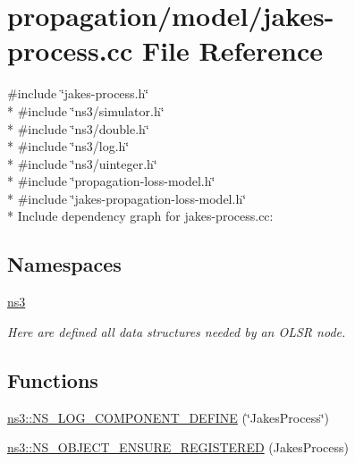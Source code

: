 \hypertarget{jakes-process_8cc}{}\section{propagation/model/jakes-\/process.cc File Reference}
\label{jakes-process_8cc}
{\ttfamily \#include \char`\"{}jakes-\/process.\+h\char`\"{}}\\*
{\ttfamily \#include \char`\"{}ns3/simulator.\+h\char`\"{}}\\*
{\ttfamily \#include \char`\"{}ns3/double.\+h\char`\"{}}\\*
{\ttfamily \#include \char`\"{}ns3/log.\+h\char`\"{}}\\*
{\ttfamily \#include \char`\"{}ns3/uinteger.\+h\char`\"{}}\\*
{\ttfamily \#include \char`\"{}propagation-\/loss-\/model.\+h\char`\"{}}\\*
{\ttfamily \#include \char`\"{}jakes-\/propagation-\/loss-\/model.\+h\char`\"{}}\\*
Include dependency graph for jakes-\/process.cc\+:
\subsection*{Namespaces}
\begin{DoxyCompactItemize}
\item 
 \hyperlink{namespacens3}{ns3}
\begin{DoxyCompactList}\small\item\em Here are defined all data structures needed by an O\+L\+SR node. \end{DoxyCompactList}\end{DoxyCompactItemize}
\subsection*{Functions}
\begin{DoxyCompactItemize}
\item 
\hyperlink{namespacens3_a90eb803120a2e9736536228b3a8eb325}{ns3\+::\+N\+S\+\_\+\+L\+O\+G\+\_\+\+C\+O\+M\+P\+O\+N\+E\+N\+T\+\_\+\+D\+E\+F\+I\+NE} (\char`\"{}Jakes\+Process\char`\"{})
\item 
\hyperlink{namespacens3_a7463a6b0ba208b1790bc2ac1d448f6cf}{ns3\+::\+N\+S\+\_\+\+O\+B\+J\+E\+C\+T\+\_\+\+E\+N\+S\+U\+R\+E\+\_\+\+R\+E\+G\+I\+S\+T\+E\+R\+ED} (Jakes\+Process)
\end{DoxyCompactItemize}
